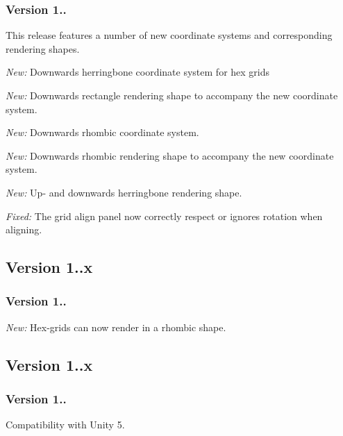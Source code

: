 \subsubsection*{Version 1..}

This release features a number of new coordinate systems and corresponding rendering shapes.
\begin{DoxyItemize}
\item {\itshape New\+:} Downwards herringbone coordinate system for hex grids
\item {\itshape New\+:} Downwards rectangle rendering shape to accompany the new coordinate system.
\item {\itshape New\+:} Downwards rhombic coordinate system.
\item {\itshape New\+:} Downwards rhombic rendering shape to accompany the new coordinate system.
\item {\itshape New\+:} Up-\/ and downwards herringbone rendering shape.
\item {\itshape Fixed\+:} The grid align panel now correctly respect or ignores rotation when aligning. 


\end{DoxyItemize}

\subsection*{Version 1..\+x }

\subsubsection*{Version 1..}


\begin{DoxyItemize}
\item {\itshape New\+:} Hex-\/grids can now render in a rhombic shape. 


\end{DoxyItemize}

\subsection*{Version 1..\+x }

\subsubsection*{Version 1..}


\begin{DoxyItemize}
\item Compatibility with Unity 5.
\end{DoxyItemize}

